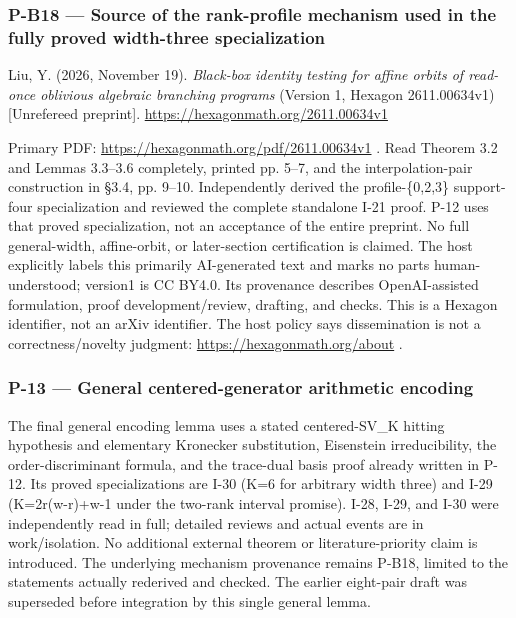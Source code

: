 \documentclass[11pt,a4paper]{article}
\theoremstyle{definition}\newtheorem{definition}{Definition}
\begin{document}
\subsubsection{P-B18 --- Source of the rank-profile mechanism used in
the fully proved width-three
specialization}\label{p-b18--source-of-the-rank-profile-mechanism-used-in-the-fully-proved-width-three-specialization}

Liu, Y. (2026, November 19). \emph{Black-box identity testing for affine
orbits of read-once oblivious algebraic branching programs} (Version 1,
Hexagon 2611.00634v1) {[}Unrefereed preprint{]}.
\url{https://hexagonmath.org/2611.00634v1}

Primary PDF: \url{https://hexagonmath.org/pdf/2611.00634v1} . Read
Theorem 3.2 and Lemmas 3.3--3.6 completely, printed pp. 5--7, and the
interpolation-pair construction in §3.4, pp. 9--10. Independently
derived the profile-\{0,2,3\} support-four specialization and reviewed
the complete standalone I-21 proof. P-12 uses that proved
specialization, not an acceptance of the entire preprint. No full
general-width, affine-orbit, or later-section certification is claimed.
The host explicitly labels this primarily AI-generated text and marks no
parts human-understood; version1 is CC BY4.0. Its provenance describes
OpenAI-assisted formulation, proof development/review, drafting, and
checks. This is a Hexagon identifier, not an arXiv identifier. The host
policy says dissemination is not a correctness/novelty judgment:
\url{https://hexagonmath.org/about} .

\subsubsection{P-13 --- General centered-generator arithmetic
encoding}\label{p-13--general-centered-generator-arithmetic-encoding}

The final general encoding lemma uses a stated centered-SV\_K hitting
hypothesis and elementary Kronecker substitution, Eisenstein
irreducibility, the order-discriminant formula, and the trace-dual basis
proof already written in P-12. Its proved specializations are I-30 (K=6
for arbitrary width three) and I-29 (K=2r(w-r)+w-1 under the two-rank
interval promise). I-28, I-29, and I-30 were independently read in full;
detailed reviews and actual events are in work/isolation. No additional
external theorem or literature-priority claim is introduced. The
underlying mechanism provenance remains P-B18, limited to the statements
actually rederived and checked. The earlier eight-pair draft was
superseded before integration by this single general lemma.
\end{document}
